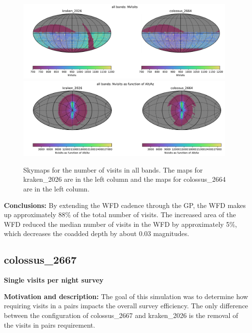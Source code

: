 \documentclass[DM,authoryear,toc]{lsstdoc}
\begin{document}
\begin{figure}[ht]
\centering
\includegraphics[width=0.98\textwidth]{figures/kraken_2026_colossus_2664_NVisits_all_bands_HEAL_ComboSkyMap.pdf}\\
\includegraphics[width=0.98\textwidth]{figures/kraken_2026_colossus_2664_Nvisits_as_function_of_Alt_Az_all_bands_HEAL_ComboSkyMap.pdf}
\caption{Skymaps for the number of visits in all bands. The maps for kraken\_2026 are in the left column and the maps for colossus\_2664 are
in the left column.}
\label{fig:nvisits-2664}
\end{figure}

\textbf{Conclusions:} By extending the WFD cadence through the GP, the WFD makes up approximately 88$\%$ of the total number of visits.
The increased area of the WFD reduced the median number of visits in the WFD by approximately 5$\%$, which decreases the coadded depth
by about 0.03 magnitudes.

\subsection{colossus\_2667} \label{colossus2667}

\textbf{Single visits per night survey}

\textbf{Motivation and description:} The goal of this simulation was to determine how requiring visits in a pairs
impacts the overall survey efficiency. The only difference between the configuration of colossus\_2667
and kraken\_2026 is the removal of the visits in pairs requirement.
\end{document}
